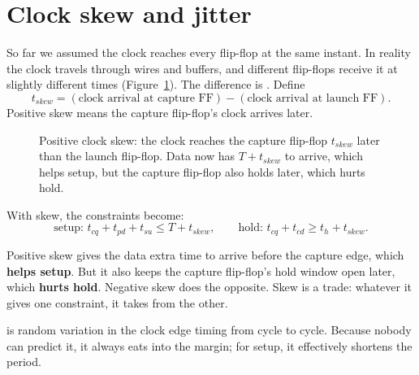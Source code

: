 \section{Clock skew and jitter}

So far we assumed the clock reaches every flip-flop at the same instant. In reality the clock travels through wires and buffers, and different flip-flops receive it at slightly different times (Figure~\ref{fig:skew}). The difference is . Define
\[
  t_{skew} = (\text{clock arrival at capture FF}) - (\text{clock arrival at launch FF}).
\]
Positive skew means the capture flip-flop's clock arrives later.

\begin{figure}[h]
\centering
{}
\caption{Positive clock skew: the clock reaches the capture flip-flop $t_{skew}$ later than the launch flip-flop. Data now has $T + t_{skew}$ to arrive, which helps setup, but the capture flip-flop also holds later, which hurts hold.}
\label{fig:skew}
\end{figure}

With skew, the constraints become:
\[
  \text{setup: } t_{cq} + t_{pd} + t_{su} \le T + t_{skew}, \qquad
  \text{hold: } t_{cq} + t_{cd} \ge t_h + t_{skew}.
\]

Positive skew gives the data extra time to arrive before the capture edge, which \textbf{helps setup}. But it also keeps the capture flip-flop's hold window open later, which \textbf{hurts hold}. Negative skew does the opposite. Skew is a trade: whatever it gives one constraint, it takes from the other.

 is random variation in the clock edge timing from cycle to cycle. Because nobody can predict it, it always eats into the margin; for setup, it effectively shortens the period.


